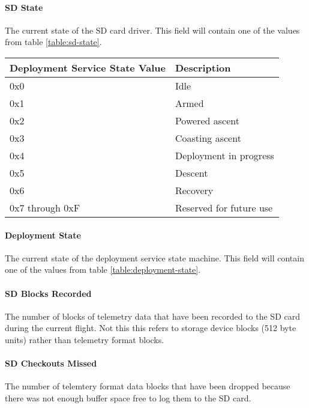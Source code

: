 \paragraph{SD State}
The current state of the SD card driver. This field will contain one of the values from table \ref{table:sd-state}.

\begin{table*}[htb]
    \centering
    \begin{tabular}{@{}ll@{}}
        \toprule
        Deployment Service State Value & Description             \\
        \midrule
        0x0                            & Idle                    \\
        0x1                            & Armed                   \\
        0x2                            & Powered ascent          \\
        0x3                            & Coasting ascent         \\
        0x4                            & Deployment in progress  \\
        0x5                            & Descent                 \\
        0x6                            & Recovery                \\
        0x7 through 0xF                & Reserved for future use \\
        \bottomrule
    \end{tabular}
    \caption{Deployment Service States}
    \label{table:deployment-state}
\end{table*}

\paragraph{Deployment State}
The current state of the deployment service state machine. This field will contain one of the values from table
\ref{table:deployment-state}.

\paragraph{SD Blocks Recorded}
The number of blocks of telemetry data that have been recorded to the SD card during the current flight. Not this this
refers to storage device blocks (512 byte units) rather than telemetry format blocks.

\paragraph{SD Checkouts Missed}
The number of telemtery format data blocks that have been dropped because there was not enough buffer space free to log
them to the SD card.

